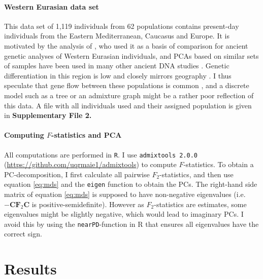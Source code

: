 \documentclass[12pt,fullpage, a4paper]{article}
\newcommand{\MC}{\mathbf{C}} %
\newcommand{\MF}{\mathbf{F}_2} %
\begin{document}
\paragraph{Western Eurasian data set}
This data set of 1,119 individuals from 62 populations contains  present-day individuals from the Eastern Mediterranean, Caucasus and Europe. It is motivated by the analysis of \cite{lazaridis2014}, who used it as a basis of comparison for ancient genetic analyses of Western Eurasian individuals, and PCAs based on similar sets of samples have been used in many other ancient DNA studies \citep[e.g.][]{lazaridis2016, haak2015}. Genetic differentiation in this region is low and closely mirrors geography \citep{novembre2008}. I thus speculate that gene flow between these populations is common \citep{ralph2013}, and a discrete model such as a tree or an admixture graph might be a rather poor reflection of this data. A file with all individuals used and their assigned population is given in \textbf{Supplementary File 2.}


\paragraph{Computing $F$-statistics and PCA}
All computations are performed in \texttt{R}. I use \texttt{admixtools 2.0.0} (\url{https://github.com/uqrmaie1/admixtools}) to compute $F$-statistics. To obtain a PC-decomposition, I first calculate all pairwise $F_2$-statistics, and then use equation \ref{eq:mds} and the \texttt{eigen} function to obtain the PCs. The right-hand side matrix of equation \ref{eq:mds} is supposed to have non-negative eigenvalues (i.e. $-\MC\MF\MC$ is positive-semidefinite). However as $F_2$-statistics are estimates, some eigenvalues might be slightly negative, which would lead to imaginary PCs. I avoid this by using the \texttt{nearPD}-function in R that ensures all eigenvalues have the correct sign.

\section{Results}
\end{document}
